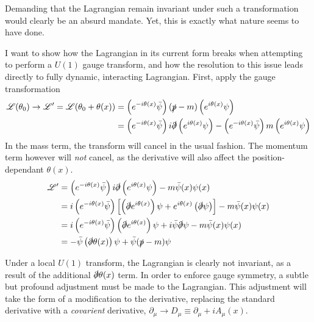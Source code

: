     Demanding that the Lagrangian remain invariant under such a transformation would clearly be an absurd mandate.
    Yet, this is exactly what nature seems to have done.

    I want to show how the Lagrangian in its current form breaks when attempting to perform a $U(1)$ gauge transform,
        and how the resolution to this issue leads directly to fully dynamic, interacting Lagrangian.
    First, apply the gauge transformation
    \begin{equation} \begin{split}
        \mathscr{L}(\theta_0) \to \mathscr{L}' = \mathscr{L}(\theta_0+\theta(x)) &=
            \left( e^{-i\theta(x)} \bar{\psi} \right) (\slashed{p} - m) \left( e^{i\theta(x)}\psi \right)
            \\ &= \left( e^{-i\theta(x)} \bar{\psi} \right) i\slashed{\partial} \left( e^{i\theta(x)}\psi \right)
                - \left( e^{-i\theta(x)} \bar{\psi} \right) m \left( e^{i\theta(x)}\psi \right)
    \end{split} \end{equation}
    In the mass term, the transform will cancel in the usual fashion.
    The momentum term however will \textit{not} cancel, as the derivative will also affect the position-dependant $\theta(x)$.
    \begin{equation} \begin{split}
        \mathscr{L}' &= \left( e^{-i\theta(x)} \bar{\psi} \right) i\slashed{\partial} \left( e^{i\theta(x)}\psi \right) - m \bar{\psi}(x) \psi(x)
        \\ &= i \left( e^{-i\theta(x)} \bar{\psi} \right) \left[
                \left( \slashed{\partial} e^{i\theta(x)} \right) \psi 
                + e^{i\theta(x)} \left( \slashed{\partial} \psi \right)
            \right] - m \bar{\psi}(x) \psi(x)
        \\ &= i \left( e^{-i\theta(x)} \bar{\psi} \right)
                \left( \slashed{\partial} e^{i\theta(x)} \right) \psi 
            + i \bar{\psi} \slashed{\partial} \psi
            - m \bar{\psi}(x) \psi(x)
        \\ &= - \bar{\psi} \left( \slashed{\partial}\theta(x) \right) \psi 
            + \bar{\psi} ( \slashed{p} - m ) \psi
    \end{split} \end{equation}

    Under a local $U(1)$ transform, the Lagrangian is clearly not invariant,
        as a result of the additional $\slashed{\partial}\theta(x)$ term.
    In order to enforce gauge symmetry, a subtle but profound adjustment must be made to the Lagrangian.
    This adjustment will take the form of a modification to the derivative,
        replacing the standard derivative with a \textit{covarient} derivative, $\partial_\mu \to D_\mu \equiv \partial_\mu + i A_\mu(x)$.


